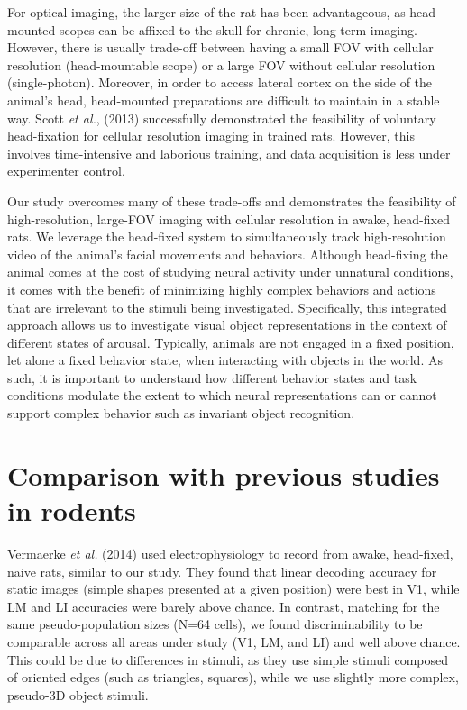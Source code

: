 For optical imaging, the larger size of the rat has been advantageous, as head-mounted scopes can be affixed to the skull for chronic, long-term imaging. However, there is usually trade-off between having a small FOV with cellular resolution (head-mountable scope) or a large FOV without cellular resolution (single-photon). Moreover, in order to access lateral cortex on the side of the animal’s head, head-mounted preparations are difficult to maintain in a stable way. Scott \textit{et al.}, (2013) successfully demonstrated the feasibility of voluntary head-fixation for cellular resolution imaging in trained rats. However, this involves time-intensive and laborious training, and data acquisition is less under experimenter control. 

Our study overcomes many of these trade-offs and demonstrates the feasibility of high-resolution, large-FOV imaging with cellular resolution in awake, head-fixed rats. We leverage the head-fixed system to simultaneously track high-resolution video of the animal’s facial movements and behaviors. Although head-fixing the animal comes at the cost of studying neural activity under unnatural conditions, it comes with the benefit of minimizing highly complex behaviors and actions that are irrelevant to the stimuli being investigated. Specifically, this integrated approach allows us to investigate visual object representations in the context of different states of arousal. Typically, animals are not engaged in a fixed position, let alone a fixed behavior state, when interacting with objects in the world. As such, it is important to understand how different behavior states and task conditions modulate the extent to which neural representations can or cannot support complex behavior such as invariant object recognition.


\section{Comparison with previous studies in rodents}
Vermaerke \textit{et al.} (2014) used electrophysiology to record from awake, head-fixed, naive rats, similar to our study. They found that linear decoding accuracy for static images (simple shapes presented at a given position) were best in V1, while LM and LI accuracies were barely above chance. In contrast, matching for the same pseudo-population sizes (N=64 cells), we found discriminability to be comparable across all areas under study (V1, LM, and LI) and well above chance. This could be due to differences in stimuli, as they use simple stimuli composed of oriented edges (such as triangles, squares), while we use slightly more complex, pseudo-3D object stimuli.

